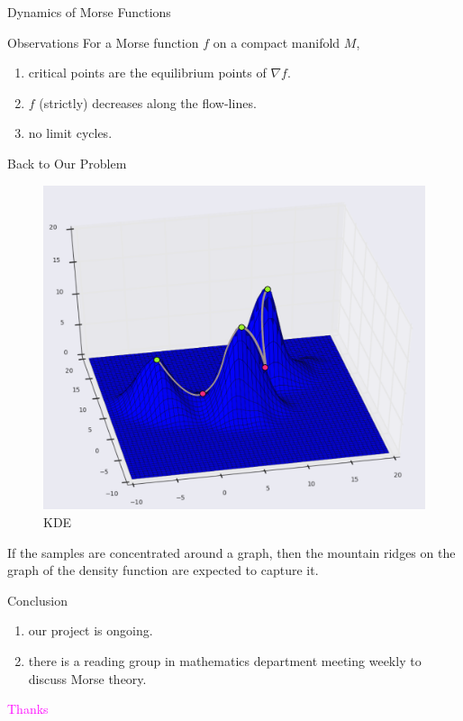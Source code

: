\documentclass[10pt,sans-serif]{beamer}
\begin{document}
\begin{frame}{Dynamics of Morse Functions}
  \begin{block}{Observations}
    For a Morse function $f$ on a compact manifold $M$,
    \begin{enumerate}
    \item critical points are the equilibrium points of $\nabla f$.
      \pause
    \item $f$ (strictly) decreases along the flow-lines. 
      \pause
    \item no limit cycles.
    \end{enumerate}
  \end{block}
\end{frame}


\begin{frame}{Back to Our Problem}
  \begin{figure}[htb]
    \centering \includegraphics[scale=0.25]{ridges}
    \caption{KDE}
  \end{figure}

  \begin{block}{}
    If the samples are concentrated around a graph, then the mountain ridges on
    the graph of the density function are expected to capture it.
  \end{block}
\end{frame}

\begin{frame}{Conclusion}
  \begin{enumerate}
  \item our project is ongoing.
  \item there is a reading group in mathematics department meeting weekly to
    discuss Morse theory.
  \end{enumerate}
\end{frame}

\begin{frame}
  \centering
  \Huge{\textcolor{magenta}{Thanks}}
\end{frame}
\end{document}
